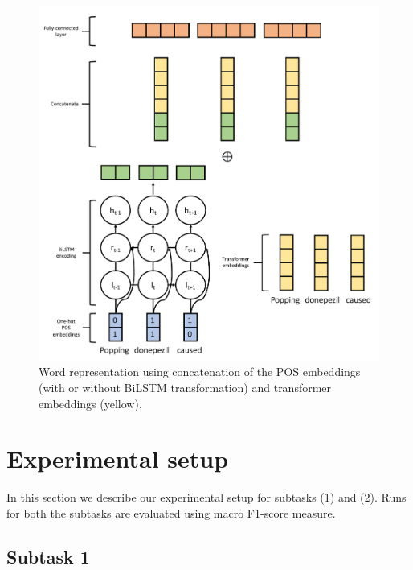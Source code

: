 \documentclass[11pt]{article}
\begin{document}
\begin{figure}[!htbp]
    \centering
    \includegraphics[width=\columnwidth]{figures/word_arch.pdf}
    \caption{Word representation using concatenation of the POS embeddings (with or without BiLSTM transformation) and transformer embeddings (yellow).}
    \label{fig:ann_scheme}
\end{figure}


%
%
%
\section{Experimental setup}
In this section we describe our experimental setup for subtasks (1) and (2). 
%
%
%
Runs for both the subtasks are evaluated using macro F1-score measure.
%
%
%
\subsection{Subtask 1}
\end{document}

